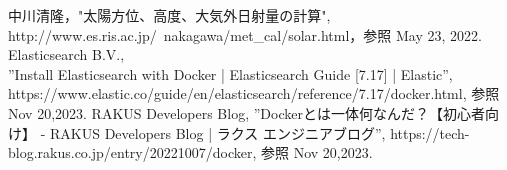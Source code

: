 \begin{thebibliography}{99}

中川清隆，"太陽方位、高度、大気外日射量の計算", http://www.es.ris.ac.jp/~nakagawa/met\_cal/solar.html，参照 May 23, 2022.
Elasticsearch B.V.,\\ ”Install Elasticsearch with Docker | Elasticsearch Guide [7.17] | Elastic”, https://www.elastic.co/guide/en/elasticsearch/reference/7.17/docker.html, 参照 Nov 20,2023.
RAKUS Developers Blog, ”Dockerとは一体何なんだ？【初心者向け】 - RAKUS Developers Blog | ラクス エンジニアブログ”, https://tech-blog.rakus.co.jp/entry/20221007/docker, 参照 Nov 20,2023.
\end{thebibliography}
